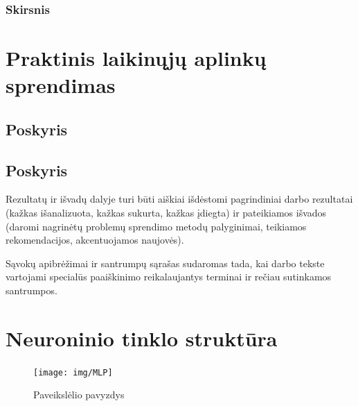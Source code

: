 \documentclass{VUMIFPSkursinis}
\begin{document}
\subsubsection{Skirsnis}


\section{Praktinis laikinųjų aplinkų sprendimas}
\subsection{Poskyris}
\subsection{Poskyris}

Rezultatų ir išvadų dalyje turi būti aiškiai išdėstomi pagrindiniai darbo
rezultatai (kažkas išanalizuota, kažkas sukurta, kažkas įdiegta) ir pateikiamos
išvados (daromi nagrinėtų problemų sprendimo metodų palyginimai, teikiamos
rekomendacijos, akcentuojamos naujovės).

\printbibliography[heading=bibintoc]  %

Sąvokų apibrėžimai ir santrumpų sąrašas sudaromas tada, kai darbo tekste
vartojami specialūs paaiškinimo reikalaujantys terminai ir rečiau sutinkamos
santrumpos.

\appendix  %

\section{Neuroninio tinklo struktūra}
\begin{figure}[H]
    \centering
    \texttt{[image: img/MLP]}
    \caption{Paveikslėlio pavyzdys}
    \label{img:mlp}
\end{figure}
\end{document}
